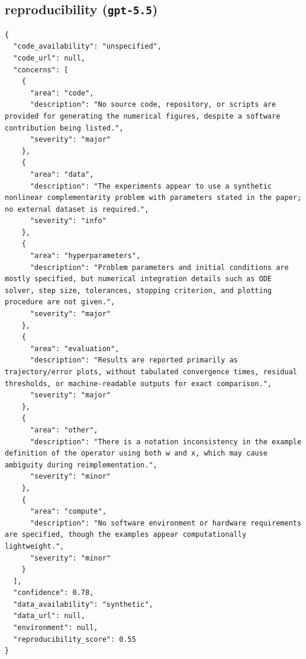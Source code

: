 \documentclass[11pt]{article}
\begin{document}
\subsection*{reproducibility (\texttt{gpt-5.5})}
\begin{verbatim}
{
  "code_availability": "unspecified",
  "code_url": null,
  "concerns": [
    {
      "area": "code",
      "description": "No source code, repository, or scripts are provided for generating the numerical figures, despite a software contribution being listed.",
      "severity": "major"
    },
    {
      "area": "data",
      "description": "The experiments appear to use a synthetic nonlinear complementarity problem with parameters stated in the paper; no external dataset is required.",
      "severity": "info"
    },
    {
      "area": "hyperparameters",
      "description": "Problem parameters and initial conditions are mostly specified, but numerical integration details such as ODE solver, step size, tolerances, stopping criterion, and plotting procedure are not given.",
      "severity": "major"
    },
    {
      "area": "evaluation",
      "description": "Results are reported primarily as trajectory/error plots, without tabulated convergence times, residual thresholds, or machine-readable outputs for exact comparison.",
      "severity": "major"
    },
    {
      "area": "other",
      "description": "There is a notation inconsistency in the example definition of the operator using both w and x, which may cause ambiguity during reimplementation.",
      "severity": "minor"
    },
    {
      "area": "compute",
      "description": "No software environment or hardware requirements are specified, though the examples appear computationally lightweight.",
      "severity": "minor"
    }
  ],
  "confidence": 0.78,
  "data_availability": "synthetic",
  "data_url": null,
  "environment": null,
  "reproducibility_score": 0.55
}
\end{verbatim}
\end{document}
